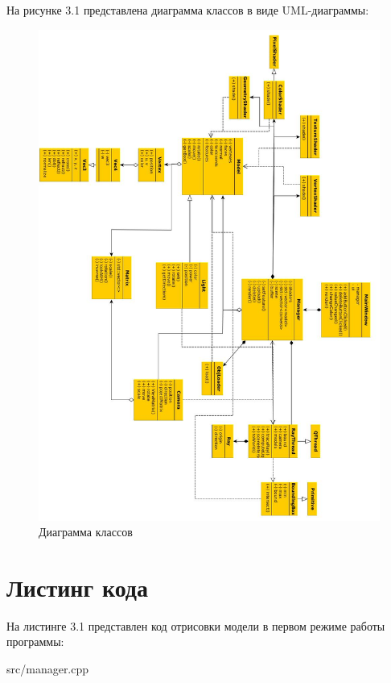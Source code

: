 На рисунке 3.1 представлена диаграмма классов в виде UML-диаграммы:
\FloatBarrier
\begin{figure}[h]
	\begin{center}
		\includegraphics[width=\linewidth]{graph/uml1.jpg}
	\end{center}
	\caption{Диаграмма классов}
\end{figure}
\FloatBarrier

\section{Листинг кода}
На листинге 3.1 представлен код отрисовки модели в первом режиме работы программы:
\FloatBarrier
\begin{lstinputlisting}[language=C++, caption=Код отрисовки модели в первом режиме работы программы, 
	linerange={90-116}, basicstyle=\footnotesize\ttfamily, frame=single,breaklines=true]{src/manager.cpp}
\end{lstinputlisting}
\FloatBarrier

